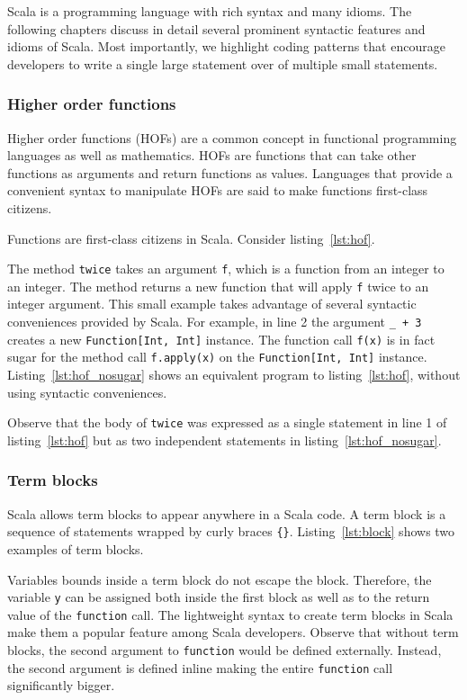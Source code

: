 Scala is a programming language with rich syntax and many idioms.
The following chapters discuss in detail several prominent syntactic features and idioms of Scala.
Most importantly, we highlight coding patterns that encourage developers to write a single large statement over of multiple small statements.

\subsubsection{Higher order functions}
Higher order functions (HOFs) are a common concept in functional programming languages as well as mathematics.
HOFs are functions that can take other functions as arguments and return functions as values.
Languages that provide a convenient syntax to manipulate HOFs are said to make functions first-class citizens.

Functions are first-class citizens in Scala.
Consider listing~\ref{lst:hof}.

The method \texttt{twice} takes an argument \texttt{f}, which is a function from an integer to an integer.
The method returns a new function that will apply \texttt{f} twice to an integer argument.
This small example takes advantage of several syntactic conveniences provided by Scala.
For example, in line 2 the argument \texttt{\_ + 3} creates a new \texttt{Function[Int, Int]} instance.
The function call \texttt{f(x)} is in fact sugar for the method call \texttt{f.apply(x)} on the \texttt{Function[Int, Int]} instance.
Listing~\ref{lst:hof_nosugar} shows an equivalent program to listing~\ref{lst:hof}, without using syntactic conveniences.

Observe that the body of \texttt{twice} was expressed as a single statement in line 1 of listing~\ref{lst:hof} but as two independent statements in listing~\ref{lst:hof_nosugar}.

\subsubsection{Term blocks}
Scala allows term blocks to appear anywhere in a Scala code.
A term block is a sequence of statements wrapped by curly braces \texttt{\{\}}.
Listing~\ref{lst:block} shows two examples of term blocks.

Variables bounds inside a term block do not escape the block.
Therefore, the variable \texttt{y} can be assigned both inside the first block as well as to the return value of the \texttt{function} call.
The lightweight syntax to create term blocks in Scala make them a popular feature among Scala developers.
Observe that without term blocks, the second argument to \texttt{function} would be defined externally.
Instead, the second argument is defined inline making the entire \texttt{function} call significantly bigger.

